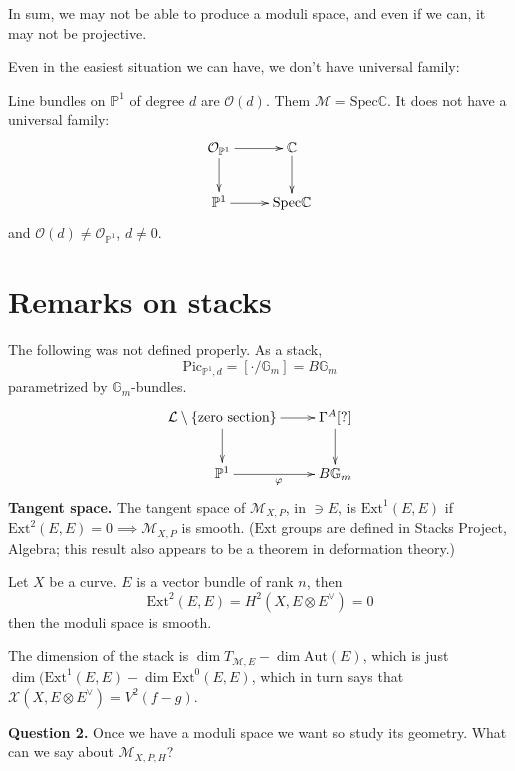 In sum, we may not be able to produce a
moduli space, and even if we can, it may
not be projective.

\medskip\noindent
Even in the easiest situation we can have, we
don't have universal family:

\begin{example}
\label{msos-label-011}
Line bundles on $\mathbb{P}^1$ of degree $d$
are $\mathcal{O}(d)$. Them
$\mathcal{M}=\text{Spec}\mathbb{C}$. It does
not have a universal family:
$$
\xymatrix{
\mathcal{O}_{\mathbb{P}^1}\ar[r]\ar[d]&
\mathbb{C}\ar[d]\\
\mathbb{P}^1\ar[r]&\text{Spec}\mathbb{C}
}
$$
and $\mathcal{O}(d) \neq
\mathcal{O}_{\mathbb{P}^1}$, $d\neq 0$.
\end{example}


\section{Remarks on stacks}
\label{section-remarks-on-stacks}

The following was not defined properly. As a
stack,
$$
\text{Pic}_{\mathbb{P}^1,d}=\left[
\cdot/\mathbb{G}_m \right] = B\mathbb{G}_m
$$
parametrized by $\mathbb{G}_m$-bundles.
$$
\xymatrix{
\mathcal{L}\setminus\{\text{zero
section}\}\ar[r]\ar[d]&\Gamma^A[?]\ar[d]\\
\mathbb{P}^1\ar[r]_\varphi&B\mathbb{G}_m
}
$$
\medskip\noindent
{\bf Tangent space.} The tangent space of
$\mathcal{M}_{X,P}$, in $\ni E$, is
$\text{Ext}^1(E,E)$ if $\text{Ext}^2(E,E)=0
\implies  \mathcal{M}_{X,P}$ is
smooth. ($\text{Ext}$ groups are defined in
Stacks Project, Algebra; this result
also appears to be a theorem in deformation
theory.)

\begin{example}
\label{msos-label-012}
Let $X$ be a curve. $E$ is a vector bundle of
rank $n$, then
$$
\text{Ext}^2(E,E)=H^{2}(X,E \otimes
E^{\vee})=0
$$
then the moduli space is smooth.
\end{example}

The dimension of the stack is $\dim
T_{\mathcal{M},E}-\dim \text{Aut}(E)$, which
is just $\dim (\text{Ext}^1(E,E) - \dim
\text{Ext}^0(E,E)$, which in turn says
that $\mathcal{X}(X,E \otimes
E^\vee)=V^2(f-g)$.

\medskip\noindent
{\bf Question 2.} Once we have a moduli space
we want so study its geometry.
What can we say about $\mathcal{M}_{X,P,H}$?

